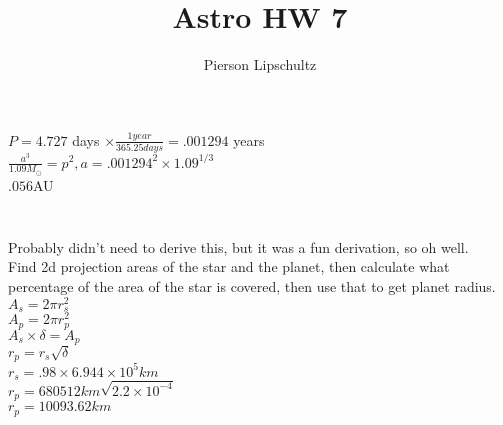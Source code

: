 \documentclass{article}
\title{Astro HW 7}
\author{Pierson Lipschultz}
\begin{document}
\maketitle
\setcounter{section}{7}

\subsection{}


\subsubsection{}

\begin{center} 
    \(P = 4.727\) days \(\times \frac{1 year}{365.25days} = .001294\) years \\
    \(\frac{a^3}{1.09 M_\odot} = p^2, a = .001294^2 \times 1.09 ^{1/3}\) \\
    \(.056\)AU 
\end{center}

\subsubsection{}

\begin{center}
    \\
    Probably didn't need to derive this, but it was a fun derivation, so oh well. \\
    Find 2d projection areas of the star and the planet, then calculate what percentage of the area of the star is covered, then use that to get planet radius.\\
    \(A_s = 2\pi r_s^2\)\\
    \(A_p = 2\pi r_p^2\)\\
    \(A_s \times \delta = A_p\)\\
    \(r_p = r_s \sqrt{\delta}\) \\
    \(r_s = .98 \times 6.944 \times 10^5km\)\\
    \(r_p = 680512km\sqrt{2.2\times10^{-4}}\)\\
    \(r_p = 10093.62km\)
\end{center}
\end{document}
